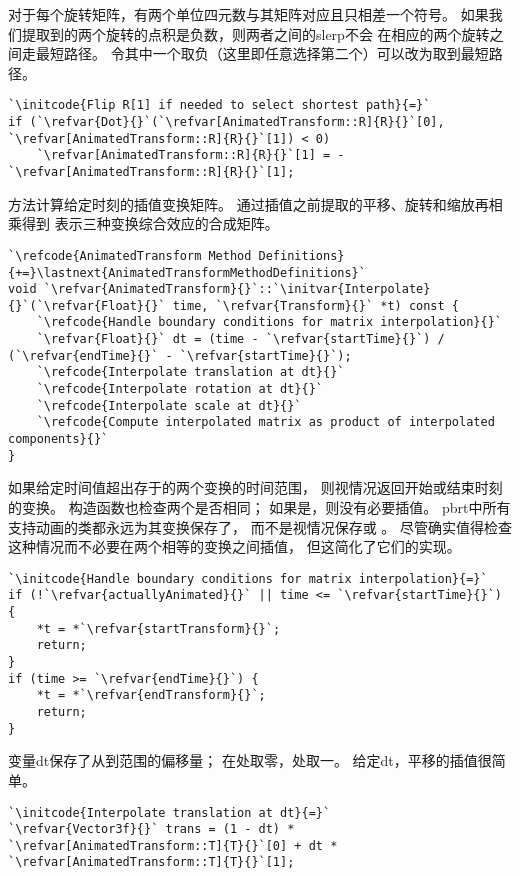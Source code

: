 对于每个旋转矩阵，有两个单位四元数与其矩阵对应且只相差一个符号。
如果我们提取到的两个旋转的点积是负数，则两者之间的slerp不会
在相应的两个旋转之间走最短路径。
令其中一个取负（这里即任意选择第二个）可以改为取到最短路径。
\begin{lstlisting}
`\initcode{Flip R[1] if needed to select shortest path}{=}`
if (`\refvar{Dot}{}`(`\refvar[AnimatedTransform::R]{R}{}`[0], `\refvar[AnimatedTransform::R]{R}{}`[1]) < 0)
    `\refvar[AnimatedTransform::R]{R}{}`[1] = -`\refvar[AnimatedTransform::R]{R}{}`[1];
\end{lstlisting}

方法计算给定时刻的插值变换矩阵。
通过插值之前提取的平移、旋转和缩放再相乘得到
表示三种变换综合效应的合成矩阵。
\begin{lstlisting}
`\refcode{AnimatedTransform Method Definitions}{+=}\lastnext{AnimatedTransformMethodDefinitions}`
void `\refvar{AnimatedTransform}{}`::`\initvar{Interpolate}{}`(`\refvar{Float}{}` time, `\refvar{Transform}{}` *t) const {
    `\refcode{Handle boundary conditions for matrix interpolation}{}`
    `\refvar{Float}{}` dt = (time - `\refvar{startTime}{}`) / (`\refvar{endTime}{}` - `\refvar{startTime}{}`);
    `\refcode{Interpolate translation at dt}{}`
    `\refcode{Interpolate rotation at dt}{}`
    `\refcode{Interpolate scale at dt}{}`
    `\refcode{Compute interpolated matrix as product of interpolated components}{}`
}
\end{lstlisting}

如果给定时间值超出存于的两个变换的时间范围，
则视情况返回开始或结束时刻的变换。
构造函数也检查两个是否相同；
如果是，则没有必要插值。
pbrt中所有支持动画的类都永远为其变换保存了，
而不是视情况保存或
。
尽管确实值得检查这种情况而不必要在两个相等的变换之间插值，
但这简化了它们的实现。
\begin{lstlisting}
`\initcode{Handle boundary conditions for matrix interpolation}{=}`
if (!`\refvar{actuallyAnimated}{}` || time <= `\refvar{startTime}{}`) { 
    *t = *`\refvar{startTransform}{}`;
    return; 
}
if (time >= `\refvar{endTime}{}`) { 
    *t = *`\refvar{endTransform}{}`;
    return; 
}
\end{lstlisting}

变量{\ttfamily dt}保存了从到范围的偏移量；
在处取零，处取一。
给定{\ttfamily dt}，平移的插值很简单。
\begin{lstlisting}
`\initcode{Interpolate translation at dt}{=}`
`\refvar{Vector3f}{}` trans = (1 - dt) * `\refvar[AnimatedTransform::T]{T}{}`[0] + dt * `\refvar[AnimatedTransform::T]{T}{}`[1];
\end{lstlisting}

